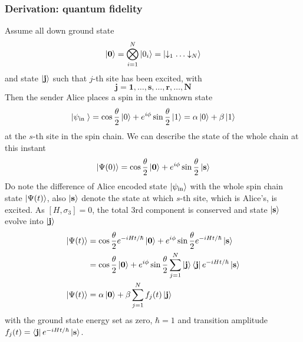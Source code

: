 \documentclass[../../../main.tex]{subfiles}
\begin{document}
\subsubsection{Derivation: quantum fidelity}
Assume all down ground state
\begin{equation*}
  \ket{\mathbf{0 } } = \bigotimes_{i=1}^N \ket{0_i} = \ket{\downarrow_1\ldots \downarrow_N}
\end{equation*}
and state $\ket{\mathbf{j}}$ such that $j$-th site has been excited, with
\begin{equation*}
  \mathbf{j}=\mathbf{1},\dots,\mathbf{s},\dots,\mathbf{r},\dots,\mathbf{N}
\end{equation*}
Then the sender Alice places a spin in the unknown state
\begin{equation*}
  \ket{\psi_\text{in }} = \cos \frac{\theta }{2 }\ket{0} + e ^{i\phi} \sin \frac{\theta }{2 } \ket{1} = \alpha \ket{0} + \beta \ket{1}
\end{equation*}
at the $s$-th site in the spin chain.
We can describe the state of the whole chain at this instant
\begin{equation*}
  \ket{\Psi(0)} = \cos \frac{\theta }{2 }\ket{\mathbf{0 }} + e ^{i\phi} \sin \frac{\theta }{2 } \ket{\mathbf{s}}
\end{equation*}
Do note the difference of Alice encoded state $\ket{\psi_\text{in}}$ with the whole spin chain state $\ket{\Psi(t)}$, also $\ket{\mathbf{s}}$ denote the state at which $s$-th site, which is Alice's, is excited.
As $[H,\sigma_3]=0$, the total 3rd component is conserved and state $\ket{\mathbf{s}}$ evolve into $\ket{\mathbf{j}}$
\begin{align*}
  \ket{\Psi(t)}
   & =  \cos \frac{\theta }{2 } e ^{-iHt/\hbar } \ket{\mathbf{0 }} + e ^{i\phi} \sin \frac{\theta }{2 } e ^{-iHt/\hbar }\ket{\mathbf{s}}                                    \\
   & =  \cos \frac{\theta }{2 }  \ket{\mathbf{0 }} + e ^{i\phi} \sin \frac{\theta }{2 } \sum_{j=1 } ^N \ket{\mathbf{j } } \bra{\mathbf{j}} e ^{-iHt/\hbar }\ket{\mathbf{s}} \\
  \ket{\Psi(t)}
   & = \alpha \ket{\mathbf{0 }} + \beta \sum_{j=1 } ^N f_j(t) \ket{\mathbf{j}}
\end{align*}
with the ground state energy set as zero, $\hbar = 1$ and transition amplitude $f_j(t) = \bra{\mathbf{j}} e ^{-iHt/\hbar }\ket{\mathbf{s}}$.
\end{document}
